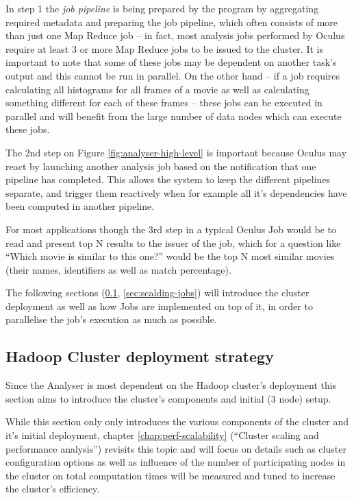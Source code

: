 In step 1 the \textit{job pipeline} is being prepared by the program by aggregating required metadata and preparing the job pipeline, which often consists of more than just one Map Reduce job -- in fact, most analysis jobs performed by Oculus require at least 3 or more Map Reduce jobs to be issued to the cluster. It is important to note that some of these jobs may be dependent on another task's output and this cannot be run in parallel. On the other hand -- if a job requires calculating all histograms for all frames of a movie as well as calculating something different for each of these frames -- these jobs can be executed in parallel and will benefit from the large number of data nodes which can execute these jobs.

The 2nd step on Figure \ref{fig:analyser-high-level} is important because Oculus may react by launching another analysis job based on the notification that one pipeline has completed. This allows the system to keep the different pipelines separate, and trigger them reactively when for example all it's dependencies have been computed in another pipeline.

For most applications though the 3rd step in a typical Oculus Job would be to read and present top N results to the issuer of the job, which for a question like ``Which movie is similar to this one?'' would be the top N most similar movies (their names, identifiers as well as match percentage).

The following sections (\ref{sec:deployment-strategy}, \ref{sec:scalding-jobs}) will introduce the cluster deployment as well as how Jobs are implemented on top of it, in order to parallelise the job's execution as much as possible.



\subsection{Hadoop Cluster deployment strategy}
\label{sec:deployment-strategy}

Since the Analyser is most dependent on the Hadoop cluster's deployment this section aims to introduce the cluster's components and initial (3 node) setup. 

While this section only only introduces the various components of the cluster and it's initial deployment, chapter \ref{chap:perf-scalability} (``Cluster scaling and performance analysis'') revisits this topic and will focus on details such as cluster configuration options as well as influence of the number of participating nodes in the cluster on total computation times will be measured and tuned to increase the cluster's efficiency.


